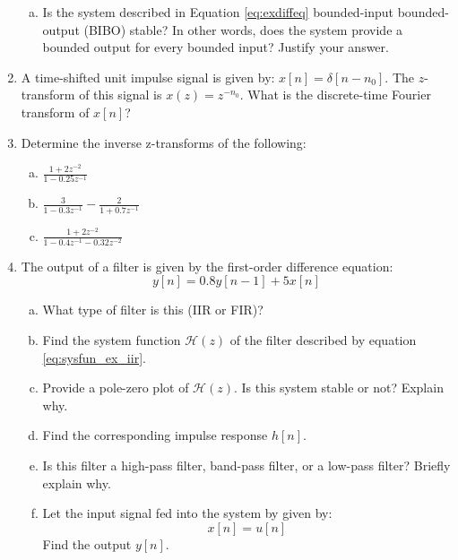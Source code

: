 \begin{enumerate}
\begin{enumerate}[a)]
\item Is the system described in Equation \ref{eq:exdiffeq} bounded-input bounded-output (BIBO) stable? In other words, does the system provide a bounded output for every bounded input? Justify your answer.

\end{enumerate}


\item A time-shifted unit impulse signal is given by: $x[n]=\delta[n-n_0]$. The $z$-transform of this signal is $x(z)=z^{-n_0}$. What is the discrete-time Fourier transform of $x[n]$?


\item Determine the inverse z-transforms of the following:
\begin{enumerate}[a)]
\item $\frac{1+2z^{-2}}{1-0.25z^{-1}}$
\item $\frac{3}{1-0.3z^{-1}} - \frac{2}{1+0.7z^{-1}}$
\item $\frac{1+2z^{-2}}{1-0.4z^{-1}-0.32 z^{-2}}$
\end{enumerate}


\item The output of a filter is given by the first-order difference equation:
\begin{equation}
y[n]=0.8y[n-1]+5x[n]
\label{eq:sysfun_ex_iir}
\end{equation}
\begin{enumerate}[a)]
\item What type of filter is this (IIR or FIR)?
\item Find the system function $\mathcal{H}(z)$ of the filter described by equation \ref{eq:sysfun_ex_iir}.
\item Provide a pole-zero plot of $\mathcal{H}(z)$. Is this system stable or not? Explain why.
\item Find the corresponding impulse response $h[n]$.
\item Is this filter a high-pass filter, band-pass filter, or a low-pass filter? Briefly explain why.
\item Let the input signal fed into the system by given by:
\begin{equation}
x[n]=u[n]
\end{equation}
Find the output $y[n]$.
\end{enumerate}



\end{enumerate}
